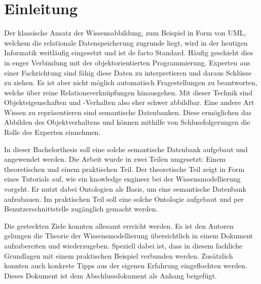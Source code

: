 \chapter{Einleitung}
\label{chap:einleitung}


Der klassische Ansatz der Wissensabbildung, zum Beispiel in Form von UML, welchem die relationale Datenspeicherung zugrunde liegt, wird in der heutigen Informatik weitläufig eingesetzt und ist de facto Standard. Häufig geschieht dies in enger Verbindung mit der objektorientierten Programmierung. Experten aus einer Fachrichtung sind fähig diese Daten zu interpretieren und daraus Schlüsse zu ziehen. Es ist aber nicht möglich automatisch Fragestellungen zu beantworten, welche über reine Relationsverknüpfungen hinausgehen. Mit dieser Technik sind Objekteigenschaften und -Verhalten also eher schwer abbildbar. Eine andere Art Wissen zu repräsentieren sind semantische Datenbanken. Diese ermöglichen das Abbilden des Objektverhaltens und können mithilfe von Schlussfolgerungen die Rolle des Experten einnehmen.

In dieser Bachelorthesis soll eine solche semantische Datenbank aufgebaut und angewendet werden.  Die Arbeit wurde in zwei Teilen umgesetzt: Einem  theoretischen und einem praktischen Teil. Der theoretische Teil zeigt in Form eines Tutorials auf, wie ein knowledge engineer bei der Wissensmodellierung vorgeht. Er nutzt dabei Ontologien als Basis, um eine semantische Datenbank aufzubauen. Im praktischen Teil soll eine solche Ontologie aufgebaut und per Benutzerschnittstelle zugänglich gemacht werden.

Die gesteckten Ziele konnten allesamt erreicht werden. Es ist den Autoren gelungen die Theorie der Wissensmodellierung übersichtlich in einem Dokument aufzubereiten und wiederzugeben. Speziell dabei ist, dass in diesem fachliche Grundlagen mit einem praktischen Beispiel verbunden werden. Zusätzlich konnten auch konkrete Tipps aus der eigenen Erfahrung eingeflochten werden. Dieses Dokument ist dem Abschlussdokument als Anhang beigefügt.

